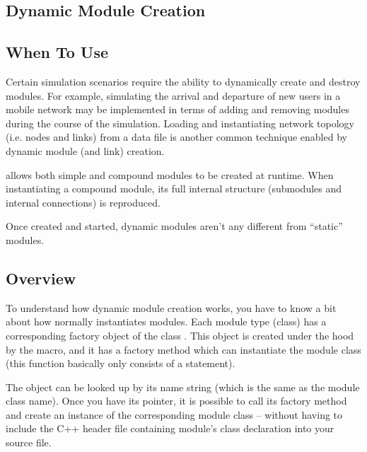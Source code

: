 \begin{ned}
\section{Dynamic Module Creation}
\label{sec:simple-modules:creating-modules}

\subsection{When To Use}
\label{sec:simple-modules:dynamic-creation:when-to-use}

Certain simulation scenarios require the ability to dynamically create
and destroy modules. For example, simulating the arrival and departure
of new users in a mobile network may be implemented in terms of adding
and removing modules during the course of the simulation. Loading and
instantiating network topology (i.e. nodes and links) from a data file
is another common technique enabled by dynamic module (and link) creation.

{\opp} allows both simple and compound modules to be created at runtime.
When instantiating a compound module, its full internal structure
(submodules and internal connections) is reproduced.

Once created and started, dynamic modules aren't any different from
``static'' modules.


\subsection{Overview}
\label{sec:simple-modules:dynamic-creation:overview}

To understand how dynamic module creation works, you have to know a
bit about how {\opp} normally instantiates modules. Each module type
(class) has a corresponding factory object of the class
. This object is created under the hood by the
 macro, and it has a factory
method which can instantiate the module class (this function basically
only consists of a  statement).

The  object can be looked up by its name
string (which is the same as the module class name). Once you have its
pointer, it is possible to call its factory method and create an
instance of the corresponding module class -- without having to
include the C++ header file containing module's class declaration
into your source file.


\end{ned}

